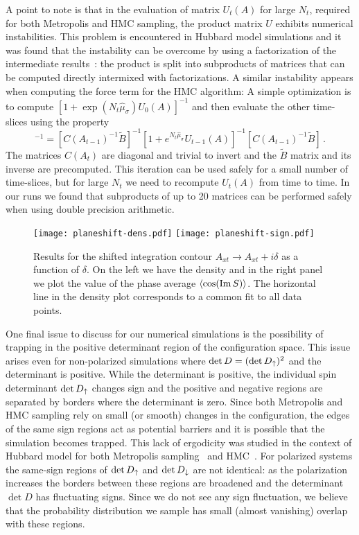 \documentclass[aps,eqsecnum,amsmath,onecolumn,groupedaddress,superscriptaddress,notitlepage,nofootinbib]{revtex4-1}
\newcommand{\beq}{\begin{equation}}
\newcommand{\eeq}{\end{equation}}
\def\Im {\mathop{\hbox{Im}}}
\def\av#1{ \left\langle #1 \right\rangle }
\begin{document}
A point to note is that in the evaluation of matrix $U_t(A)$  for large $N_t$, required for both Metropolis and HMC
sampling, the product matrix $U$ exhibits numerical instabilities. This problem is
encountered in Hubbard model simulations and it was found that the instability can be 
overcome by using a factorization of the intermediate results~\cite{White:1989zz}:
the product is split into subproducts of matrices that can be computed directly intermixed
with factorizations. A similar instability appears when computing the force term for
the HMC algorithm: A simple optimization is to compute $[1+\exp(N_t \hat\mu_\sigma)U_0(A)]^{-1}$ 
and then evaluate the other time-slices using the property 
\beq
[1+e^{N_t \hat\mu_\sigma}U_t(A)]^{-1} = 
[C(A_{t-1})^{-1}\tilde B]^{-1}[1+e^{N_t \hat\mu_\sigma}U_{t-1}(A)]^{-1}
[C(A_{t-1})^{-1}\tilde B] \,.
\eeq
The matrices $C(A_t)$ are diagonal and trivial to invert and the $\tilde B$ matrix 
and its inverse are precomputed. This iteration can be used safely for a small number of 
time-slices, but for large $N_t$ we need to recompute $U_t(A)$ from time to time. In our runs
we found that subproducts of up to 20 matrices can be performed safely when using double
precision arithmetic.

\begin{figure}[t]
\texttt{[image: planeshift-dens.pdf]}
\texttt{[image: planeshift-sign.pdf]}
\caption{Results for the shifted integration contour $A_{xt} \rightarrow  A_{xt}+i\delta$ 
as a function of $\delta$. On the left we have the density and in the right panel we plot the value of the phase average $\av{\cos(\Im S)}$. The horizontal line in the density plot corresponds
to a common fit to all data points.
}
\label{fig:planeshift}
\end{figure}

One final issue to discuss for our numerical simulations is the possibility of trapping
in the positive determinant region of the configuration space. This issue arises even
for non-polarized simulations where $\det D = (\det D_\uparrow)^2$ and the determinant is positive.
While the determinant is positive, the individual spin determinant $\det D_\uparrow$ changes
sign and the positive and negative regions are separated by borders where the determinant
is zero. Since both Metropolis and HMC sampling rely on small (or smooth) changes in 
the configuration, the edges of the same sign regions act as potential barriers and it
is possible that the simulation becomes trapped. This lack of ergodicity was studied
in the context of Hubbard model for both Metropolis sampling~\cite{PhysRevB.44.10502}
and HMC~\cite{PhysRevB.97.085144}. For polarized systems the same-sign regions of
$\det D_\uparrow$ and $\det D_\downarrow$ are not identical: as the polarization increases 
the borders between these regions 
are broadened and the determinant $\det D$ has fluctuating signs. Since we do not see
any sign fluctuation, we believe that the probability distribution we sample has small
(almost vanishing) overlap with these regions. 
\end{document}
